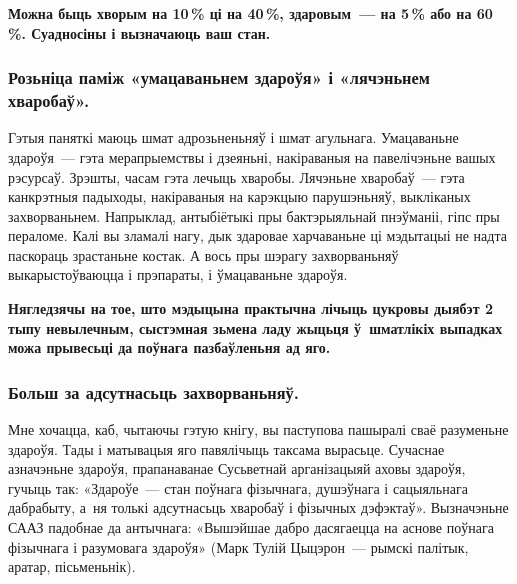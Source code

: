 \textbf{Можна быць хворым на 10\,\% ці на 40\,\%, здаровым~--- на 5\,\% або на 60\,\%. Суадносіны і вызначаюць ваш стан.}

\subsubsection{Розьніца паміж «умацаваньнем здароўя» і «лячэньнем хваробаў».} 

Гэтыя паняткі маюць шмат адрозьненьняў і шмат агульнага. Умацаваньне здароўя~--- гэта мерапрыемствы і дзеяньні, накіраваныя на павелічэньне вашых рэсурсаў. Зрэшты, часам гэта лечыць хваробы. Лячэньне хваробаў~--- гэта канкрэтныя падыходы, накіраваныя на карэкцыю парушэньняў, выкліканых захворваньнем. Напрыклад, антыбіётыкі пры бактэрыяльнай пнэўманіі, гіпс пры пераломе. Калі вы зламалі нагу, дык здаровае харчаваньне ці мэдытацыі не надта паскораць зрастаньне костак. А вось пры шэрагу захворваньняў выкарыстоўваюцца і прэпараты, і ўмацаваньне здароўя.


\textbf{Нягледзячы на тое, што мэдыцына практычна лічыць цукровы дыябэт 2 тыпу невылечным, сыстэмная зьмена ладу жыцьця ў~шматлікіх выпадках можа прывесьці да поўнага пазбаўленьня ад яго.}



\subsubsection{Больш за адсутнасьць захворваньняў.} 

Мне хочацца, каб, чытаючы гэтую кнігу, вы паступова пашыралі сваё разуменьне здароўя. Тады і матывацыя яго павялічыць таксама вырасьце. Сучаснае азначэньне здароўя, прапанаванае Сусьветнай арганізацыяй аховы здароўя, гучыць так: «Здароўе~--- стан поўнага фізычнага, душэўнага і сацыяльнага дабрабыту, а~ня толькі адсутнасьць хваробаў і фізычных дэфэктаў». Вызначэньне СААЗ падобнае да антычнага: «Вышэйшае дабро дасягаецца на аснове поўнага фізычнага і разумовага здароўя» (Марк Тулій Цыцэрон~--- рымскі палітык, аратар, пісьменьнік).

